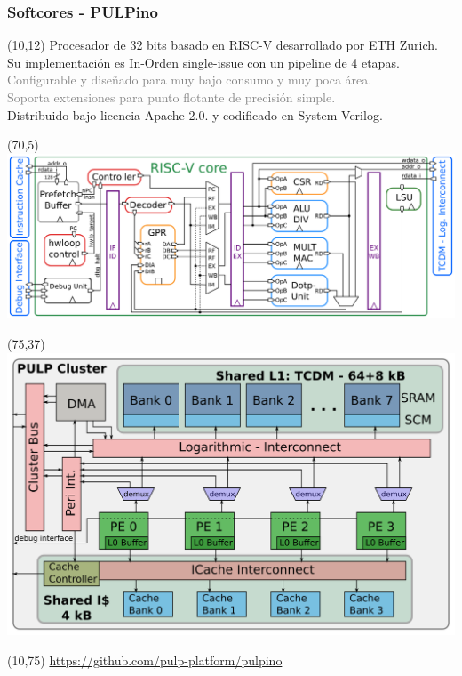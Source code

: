 \documentclass[aspectratio=169]{beamer}
\begin{document}
\begin{frame}[t,fragile]
    \frametitle{Softcores - PULPino}
    \begin{textblock}{55}(10,12) \footnotesize
    Procesador de 32 bits basado en RISC-V desarrollado por ETH Zurich.\\
    \bigskip
    Su implementación es In-Orden single-issue con un pipeline de 4 etapas.\\
    \bigskip
    \textcolor{gray}{Configurable y diseñado para muy bajo consumo y muy poca área.\\
    Soporta extensiones para punto flotante de precisión simple.}\\
    \bigskip
    Distribuido bajo licencia Apache 2.0. y codificado en System Verilog.
    \end{textblock}
    \begin{textblock}{55}(70,5) \includegraphics[scale=0.13]{imgBmp/PULPino_core.png} \end{textblock}
    \begin{textblock}{55}(75,37) \includegraphics[scale=0.13]{imgBmp/PULPino_system.png} \end{textblock}
    \begin{textblock}{70}(10,75) \footnotesize
    \url{https://github.com/pulp-platform/pulpino}
    \end{textblock}
\end{frame}
    
\end{document}
